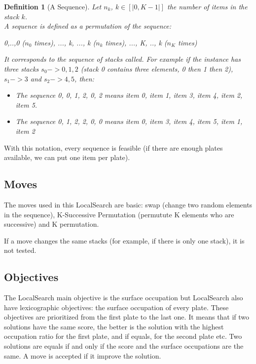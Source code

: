 \documentclass{article}
\newtheorem{definition}{Definition}
\begin{document}
\begin{definition}[A Sequence]
    Let $n_k$, $k \in [|0, K - 1|]$ the number of items in the stack $k$.\\
    A \textit{sequence} is defined as a permutation of the sequence:
\begin{center}0,..,0 ($n_0$ times), ..., k, ..., k ($n_k$ times), ..., K, .., k ($n_K$ times)\end{center}

    It corresponds to the sequence of stacks called. For example if the instance has three stacks $s_0 -> 0, 1, 2$ (stack 0 contains three elements, 0 then 1 then 2), $s_1 -> 3 $ and $s_2 -> 4, 5$, then:
    \begin{itemize}
        \item The sequence \textit{0, 0, 1, 2, 0, 2} means \textit{item 0, item 1, item 3, item 4, item 2, item 5}.
        \item The sequence \textit{0, 1, 2, 2, 0, 0} means \textit{item 0, item 3, item 4, item 5, item 1, item 2}
    \end{itemize}
\end{definition}

With this notation, every sequence is feasible (if there are enough plates available, we can put one item per plate).

\subsection{Moves}

The moves used in this LocalSearch are basic: swap (change two random elements in the sequence), K-Successive Permutation (permutute K elements who are successive) and K permutation. 

If a move changes the same stacks (for example, if there is only one stack), it is not tested.  

\subsection{Objectives}

The LocalSearch main objective is the surface occupation but LocalSearch also have lexicographic objectives: the surface occupation of every plate. These objectives are prioritized from the first plate to the last one.
It means that if two solutions have the same score, the better is the solution with the highest occupation ratio for the first plate, and if equals, for the second plate etc. Two solutions are equals if and only if the score and the surface occupations are the same. A move is accepted if it improve the solution.
\end{document}
